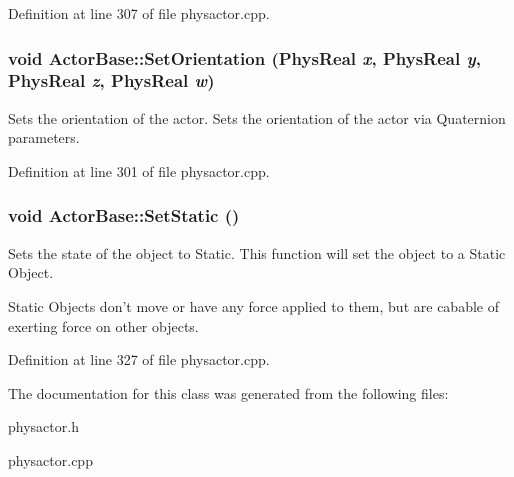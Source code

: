 Definition at line 307 of file physactor.cpp.\hypertarget{classActorBase_a9777506815a9840552b30c65d5d70f8d}{
\subsubsection[{SetOrientation}]{\setlength{\rightskip}{0pt plus 5cm}void ActorBase::SetOrientation (PhysReal {\em x}, \/  PhysReal {\em y}, \/  PhysReal {\em z}, \/  PhysReal {\em w})}}
\label{dd/d7b/classActorBase_a9777506815a9840552b30c65d5d70f8d}


Sets the orientation of the actor. Sets the orientation of the actor via Quaternion parameters. 

Definition at line 301 of file physactor.cpp.\hypertarget{classActorBase_a97f55e5fff5d69483ebb0b9042a50bb0}{
\subsubsection[{SetStatic}]{\setlength{\rightskip}{0pt plus 5cm}void ActorBase::SetStatic ()}}
\label{dd/d7b/classActorBase_a97f55e5fff5d69483ebb0b9042a50bb0}


Sets the state of the object to Static. This function will set the object to a Static Object. \par
 Static Objects don't move or have any force applied to them, but are cabable of exerting force on other objects. 

Definition at line 327 of file physactor.cpp.

The documentation for this class was generated from the following files:\begin{DoxyCompactItemize}
\item 
physactor.h\item 
physactor.cpp\end{DoxyCompactItemize}
